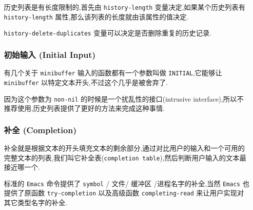 \documentclass[11pt]{article}
\begin{document}
历史列表是有长度限制的,首先由 \texttt{history-length} 变量决定,如果某个历史列表有 \texttt{history-length} 属性,那么该列表的长度就由该属性的值决定.

\texttt{history-delete-duplicates} 变量可以决定是否删除重复的历史记录.




\subsubsection{初始输入 (Initial Input)}
\label{sec:org4654092}

有几个关于 \texttt{minibuffer} 输入的函数都有一个参数叫做 \texttt{INITIAL},它能够让 \texttt{minibuffer} 以特定文本开头,不过这个几乎是被舍弃了.

因为这个参数为 \texttt{non-nil} 的时候是一个扰乱性的接口(intrusive interface),所以不推荐使用,历史列表提供了更好的方法来完成这种事情.



\subsubsection{补全 (Completion)}
\label{sec:org9321556}

补全就是根据文本的开头填充文本的剩余部分,通过对比用户的输入和一个可用的完整文本的列表,我们叫它补全表(\texttt{completion table}),然后判断用户输入的文本最接近哪一个.

标准的 \texttt{Emacs} 命令提供了 \texttt{symbol} / 文件/ 缓冲区 /进程名字的补全,当然 \texttt{Emacs} 也提供了原函数 \texttt{try-completion} 以及高级函数 \texttt{completing-read} 来让用户实现对其它类型名字的补全.
\end{document}
